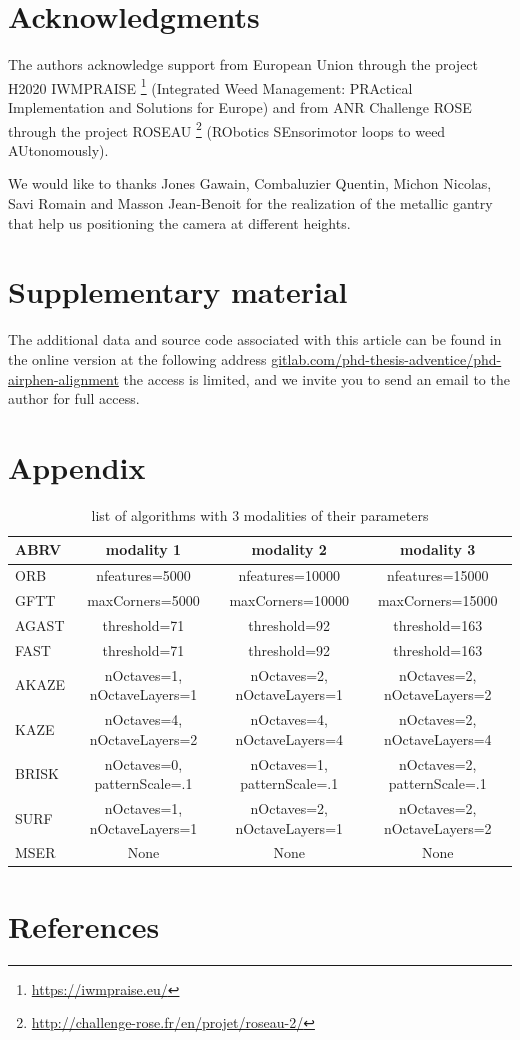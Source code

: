 \documentclass[]{elsarticle}
\begin{document}
	\section{Acknowledgments}
	
	\par The authors acknowledge support from European Union through the project H2020 IWMPRAISE \footnote{\url{https://iwmpraise.eu/}}
	(Integrated Weed Management: PRActical Implementation and Solutions for Europe)
	and from ANR Challenge ROSE through the project ROSEAU \footnote{\url{http://challenge-rose.fr/en/projet/roseau-2/}} (RObotics SEnsorimotor loops to weed AUtonomously).
	\\
	\par We would like to thanks Jones Gawain, Combaluzier Quentin, Michon Nicolas, Savi Romain and Masson Jean-Benoit
	for the realization of the metallic gantry that help us positioning the camera at different heights.
	
	\section{Supplementary material}
	
	The additional data and source code associated with this article can be found in the online version at the following address
	\url{gitlab.com/phd-thesis-adventice/phd-airphen-alignment} the access is limited,
	and we invite you to send an email to the author for full access.
	
	\section{Appendix}

	\begin{table}[H]
	\begin{tabular}{|l|c|c|c| } 
		\hline
		ABRV & modality 1 & modality 2 & modality 3 \\
		\hline
		ORB & nfeatures=5000 & nfeatures=10000 & nfeatures=15000 \\
		GFTT & maxCorners=5000 & maxCorners=10000 & maxCorners=15000 \\
		AGAST & threshold=71 & threshold=92 & threshold=163 \\
		FAST & threshold=71 & threshold=92 & threshold=163 \\
		AKAZE & nOctaves=1, nOctaveLayers=1 & nOctaves=2, nOctaveLayers=1 & nOctaves=2, nOctaveLayers=2 \\
		KAZE & nOctaves=4, nOctaveLayers=2 & nOctaves=4, nOctaveLayers=4 & nOctaves=2, nOctaveLayers=4 \\
		BRISK & nOctaves=0, patternScale=.1 & nOctaves=1, patternScale=.1 & nOctaves=2, patternScale=.1  \\
		SURF & nOctaves=1, nOctaveLayers=1 & nOctaves=2, nOctaveLayers=1 & nOctaves=2, nOctaveLayers=2 \\
		MSER & None & None & None \\
		\hline
	\end{tabular}
	\caption{list of algorithms with 3 modalities of their parameters}
	\label{tab:used-algorithms}
	\end{table}
	
	\section{References}
	
	
	
\end{document}
